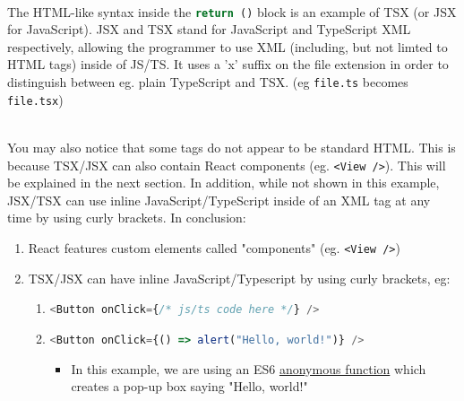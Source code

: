 \documentclass[../../main.tex]{subfiles}
\begin{document}
\noindent \\ The HTML-like syntax inside the
\lstinline[language=typescript]{return ()} block is an example
of TSX (or JSX for JavaScript). JSX and TSX stand for JavaScript
and TypeScript XML respectively, allowing the programmer
to use XML (including, but not limted to HTML tags) inside of JS/TS.
It uses a 'x' suffix on the file extension in order
to distinguish between eg. plain TypeScript and TSX.
(eg \lstinline{file.ts} becomes \lstinline{file.tsx})

\noindent \\ You may also notice that some tags do not
appear to be standard HTML. This is because TSX/JSX can also contain
React components (eg. \lstinline[language=tsx]{<View />}).
This will be explained in the next section.
In addition, while not shown in this example, JSX/TSX
can use inline JavaScript/TypeScript inside of an XML tag at any time
by using curly brackets. In conclusion:


\begin{enumerate}
  \item React features custom elements called "components" (eg. \lstinline[language=tsx]{<View />})
  \item TSX/JSX can have inline JavaScript/Typescript by using curly brackets, eg:
        \begin{enumerate}
          \item \lstinline[language=typescript]|<Button onClick={/* js/ts code here */} />|
          \item \lstinline[language=typescript]|<Button onClick={() => alert("Hello, world!")} />|
                \begin{itemize}
                  \item[\labelitemi] In this example, we are using an
                        ES6 \underline{anonymous function} which creates
                        a pop-up box saying "Hello, world!"
                \end{itemize}
        \end{enumerate}
\end{enumerate}

\end{document}
